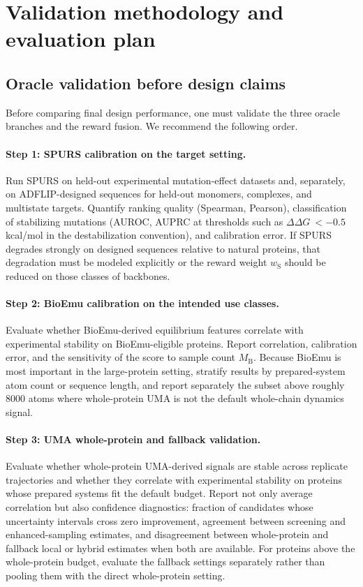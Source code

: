 \documentclass[11pt]{article}
\newcommand{\ddG}{\ensuremath{\Delta\Delta G \ }}
\begin{document}
\section{Validation methodology and evaluation plan}
\label{sec:eval}

\subsection{Oracle validation before design claims}

Before comparing final design performance, one must validate the three oracle branches and the reward fusion. We recommend the following order.

\paragraph{Step 1: SPURS calibration on the target setting.}
Run SPURS on held-out experimental mutation-effect datasets and, separately, on ADFLIP-designed sequences for held-out monomers, complexes, and multistate targets. Quantify ranking quality (Spearman, Pearson), classification of stabilizing mutations (AUROC, AUPRC at thresholds such as $\ddG<-0.5$ kcal/mol in the destabilization convention), and calibration error. If SPURS degrades strongly on designed sequences relative to natural proteins, that degradation must be modeled explicitly or the reward weight $w_{\mathrm S}$ should be reduced on those classes of backbones.

\paragraph{Step 2: BioEmu calibration on the intended use classes.}
Evaluate whether BioEmu-derived equilibrium features correlate with experimental stability on BioEmu-eligible proteins. Report correlation, calibration error, and the sensitivity of the score to sample count $M_{\mathrm B}$. Because BioEmu is most important in the large-protein setting, stratify results by prepared-system atom count or sequence length, and report separately the subset above roughly $8000$ atoms where whole-protein UMA is not the default whole-chain dynamics signal.

\paragraph{Step 3: UMA whole-protein and fallback validation.}
Evaluate whether whole-protein UMA-derived signals are stable across replicate trajectories and whether they correlate with experimental stability on proteins whose prepared systems fit the default budget. Report not only average correlation but also confidence diagnostics: fraction of candidates whose uncertainty intervals cross zero improvement, agreement between screening and enhanced-sampling estimates, and disagreement between whole-protein and fallback local or hybrid estimates when both are available. For proteins above the whole-protein budget, evaluate the fallback settings separately rather than pooling them with the direct whole-protein setting.
\end{document}
